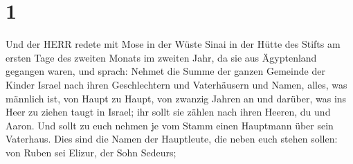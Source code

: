 \hypertarget{section}{%
\section{1}\label{section}}

 Und der HERR redete mit Mose in der Wüste Sinai in der
Hütte des Stifts am ersten Tage des zweiten Monats im zweiten Jahr, da
sie aus Ägyptenland gegangen waren, und sprach:  Nehmet die
Summe der ganzen Gemeinde der Kinder Israel nach ihren Geschlechtern und
Vaterhäusern und Namen, alles, was männlich ist, von Haupt zu Haupt,
 von zwanzig Jahren an und darüber, was ins Heer zu ziehen
taugt in Israel; ihr sollt sie zählen nach ihren Heeren, du und Aaron.
 Und sollt zu euch nehmen je vom Stamm einen Hauptmann über
sein Vaterhaus.  Dies sind die Namen der Hauptleute, die
neben euch stehen sollen: von Ruben sei Elizur, der Sohn Sedeurs;

